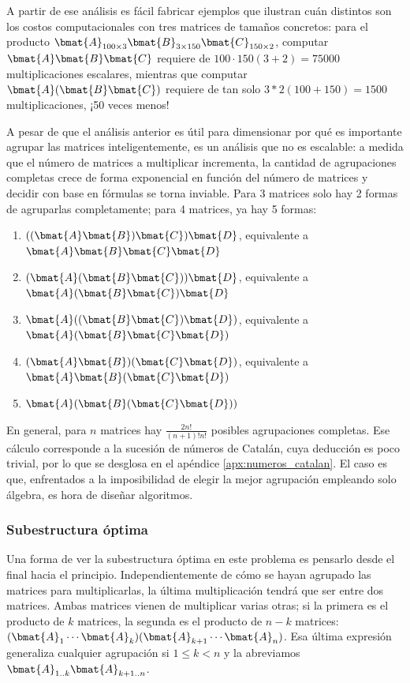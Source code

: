 A partir de ese análisis es fácil fabricar ejemplos que ilustran cuán distintos son los costos computacionales con tres matrices de tamaños concretos: para el producto \(\bmat{A}_{100\times 3} \bmat{B}_{3 \times 150} \bmat{C}_{150 \times 2}\), computar \(\bmat{A} \bmat{B} \bmat{C}\) requiere de \(100\cdot 150(3+2) = 75000\) multiplicaciones escalares, mientras que computar \(\bmat{A} (\bmat{B} \bmat{C})\) requiere de tan solo \(3 * 2(100 + 150) = 1500\) multiplicaciones, ¡50 veces menos!

A pesar de que el análisis anterior es útil para dimensionar por qué es importante agrupar las matrices inteligentemente, es un análisis que no es escalable: a medida que el número de matrices a multiplicar incrementa, la cantidad de agrupaciones completas crece de forma exponencial en función del número de matrices y decidir con base en fórmulas se torna inviable. Para 3 matrices solo hay 2 formas de agruparlas completamente; para 4 matrices, ya hay 5 formas: 
\begin{enumerate}
  \item \(((\bmat{A} \bmat{B}) \bmat{C}) \bmat{D}\), equivalente a \(\bmat{A} \bmat{B} \bmat{C} \bmat{D}\)
  \item \((\bmat{A} (\bmat{B} \bmat{C})) \bmat{D}\), equivalente a \(\bmat{A} (\bmat{B} \bmat{C}) \bmat{D}\)
  \item \(\bmat{A} ((\bmat{B} \bmat{C}) \bmat{D})\), equivalente a \(\bmat{A} (\bmat{B} \bmat{C} \bmat{D})\)
  \item \((\bmat{A} \bmat{B}) (\bmat{C} \bmat{D})\), equivalente a \(\bmat{A} \bmat{B} (\bmat{C} \bmat{D})\)
  \item \(\bmat{A} (\bmat{B} (\bmat{C} \bmat{D}))\)
\end{enumerate}
En general, para \(n\) matrices hay \(\frac{2n!}{(n+1)!n!}\) posibles agrupaciones completas. Ese cálculo corresponde a la sucesión de números de Catalán, cuya deducción es poco trivial, por lo que se desglosa en el apéndice \ref{apx:numeros_catalan}. El caso es que, enfrentados a la imposibilidad de elegir la mejor agrupación empleando solo álgebra, es hora de diseñar algoritmos.

\subsubsection{Subestructura óptima}

Una forma de ver la subestructura óptima en este problema es pensarlo desde el final hacia el principio.  Independientemente de cómo se hayan agrupado las matrices para multiplicarlas, la última multiplicación tendrá que ser entre dos matrices. Ambas matrices vienen de multiplicar varias otras; si la primera es el producto de \(k\) matrices, la segunda es el producto de \(n-k\) matrices: \((\bmat{A}_1 \cdots \bmat{A}_k)(\bmat{A}_{k+1}\cdots \bmat{A}_n)\). Esa última expresión generaliza cualquier agrupación si \(1\leq k < n\) y la abreviamos \(\bmat{A}_{1..k} \bmat{A}_{k+1..n}\).  

